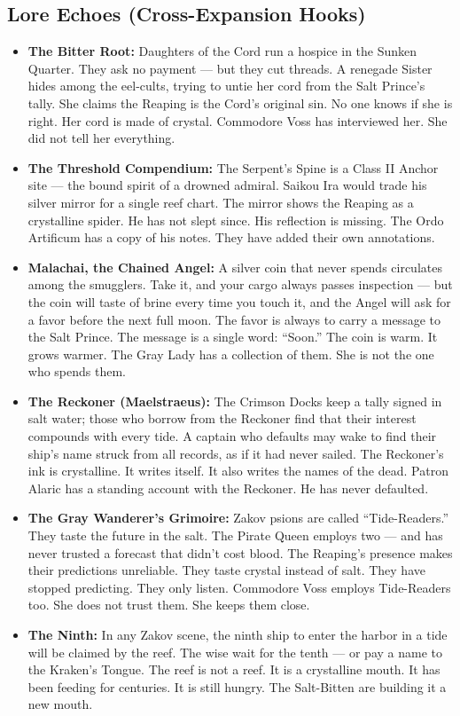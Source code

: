 \subsection*{Lore Echoes (Cross-Expansion Hooks)}
\begin{itemize}
  \item \textbf{The Bitter Root:} Daughters of the Cord run a hospice in the Sunken Quarter. They ask no payment --- but they cut threads. A renegade Sister hides among the eel-cults, trying to untie her cord from the Salt Prince's tally. She claims the Reaping is the Cord's original sin. No one knows if she is right. Her cord is made of crystal. Commodore Voss has interviewed her. She did not tell her everything.
  \item \textbf{The Threshold Compendium:} The Serpent's Spine is a Class II Anchor site --- the bound spirit of a drowned admiral. Saikou Ira would trade his silver mirror for a single reef chart. The mirror shows the Reaping as a crystalline spider. He has not slept since. His reflection is missing. The Ordo Artificum has a copy of his notes. They have added their own annotations.
  \item \textbf{Malachai, the Chained Angel:} A silver coin that never spends circulates among the smugglers. Take it, and your cargo always passes inspection --- but the coin will taste of brine every time you touch it, and the Angel will ask for a favor before the next full moon. The favor is always to carry a message to the Salt Prince. The message is a single word: ``Soon.'' The coin is warm. It grows warmer. The Gray Lady has a collection of them. She is not the one who spends them.
  \item \textbf{The Reckoner (Maelstraeus):} The Crimson Docks keep a tally signed in salt water; those who borrow from the Reckoner find that their interest compounds with every tide. A captain who defaults may wake to find their ship's name struck from all records, as if it had never sailed. The Reckoner's ink is crystalline. It writes itself. It also writes the names of the dead. Patron Alaric has a standing account with the Reckoner. He has never defaulted.
  \item \textbf{The Gray Wanderer's Grimoire:} Zakov psions are called ``Tide-Readers.'' They taste the future in the salt. The Pirate Queen employs two --- and has never trusted a forecast that didn't cost blood. The Reaping's presence makes their predictions unreliable. They taste crystal instead of salt. They have stopped predicting. They only listen. Commodore Voss employs Tide-Readers too. She does not trust them. She keeps them close.
  \item \textbf{The Ninth:} In any Zakov scene, the ninth ship to enter the harbor in a tide will be claimed by the reef. The wise wait for the tenth --- or pay a name to the Kraken's Tongue. The reef is not a reef. It is a crystalline mouth. It has been feeding for centuries. It is still hungry. The Salt-Bitten are building it a new mouth.
\end{itemize}

